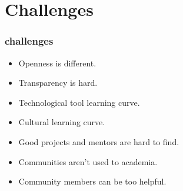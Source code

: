 \section{Challenges}
\begin{comment}
* Challenges of doing open community stuff with students
** Some problems remaining to solve (for instance, IRC's interface sucks, community members don't always understand the "shoot self in foot" redirection need, hard to find projects, etc)
\end{comment}

\begin{frame} 
\frametitle{challenges}
\begin{itemize}
	\item Openness is \alert{different}.
	\item Transparency is \alert{hard}.
	\item Technological tool learning curve.
	\item \alert{Cultural} learning curve.
	\item Good projects and mentors are hard to find.
	\item Communities aren't used to academia. %
	\item Community members can be \alert{too helpful}.
\end{itemize}
\end{frame} 
